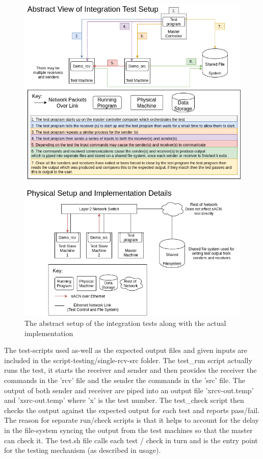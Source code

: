 \documentclass[11pt,a4paper]{article}
\begin{document}
\begin{figure}[H]
	\includegraphics[width=\textwidth]{SH-Project-Intergration-Tests-Abstract-View.png}
	\caption{The abstract setup of the integration tests along with the actual implementation}
	\label{INTEGRATION_TEST_SETUP}
\end{figure}

The test-scripts used as-well as the expected output files and given inputs are included in the script-testing/single-rcv-src folder. The test\_run script actually runs the test, it starts the receiver and sender and then provides the receiver the commands in the 'rcv' file and the sender the commands in the 'src' file. The output of both sender and receiver are piped into an output file 'xrcv-out.temp' and 'xsrc-out.temp' where 'x' is the test number. The test\_check script then checks the output against the expected output for each test and reports pass/fail. The reason for separate run/check scripts is that it helps to account for the delay in the file-system syncing the output from the test machines so that the master can check it. The test.sh file calls each test / check in turn and is the entry point for the testing mechanism (as described in usage).
\end{document}

